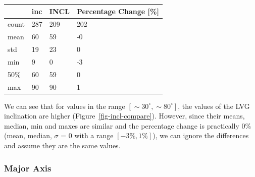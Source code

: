 \documentclass[
]{article}
\begin{document}
\begin{longtable}[]{@{}llll@{}}
\toprule\noalign{}
& inc & INCL & Percentage Change {[}\%{]} \\
\midrule\noalign{}
\endhead
\bottomrule\noalign{}
\endlastfoot
count & 287 & 209 & 202 \\
mean & 60 & 59 & -0 \\
std & 19 & 23 & 0 \\
min & 9 & 0 & -3 \\
50\% & 60 & 59 & 0 \\
max & 90 & 90 & 1 \\
\end{longtable}

We can see that for values in the range
\([\sim 30^\circ,\sim 80^\circ]\), the values of the LVG inclination are
higher (Figure~\ref{fig-incl-compare}). However, since their means,
median, min and maxes are similar and the percentage change is
practically 0\% (mean, median, \(\sigma\) = 0 with a range
\([-3\%,1\%]\)), we can ignore the differences and assume they are the
same values.

\subsubsection{Major Axis}
\end{document}

